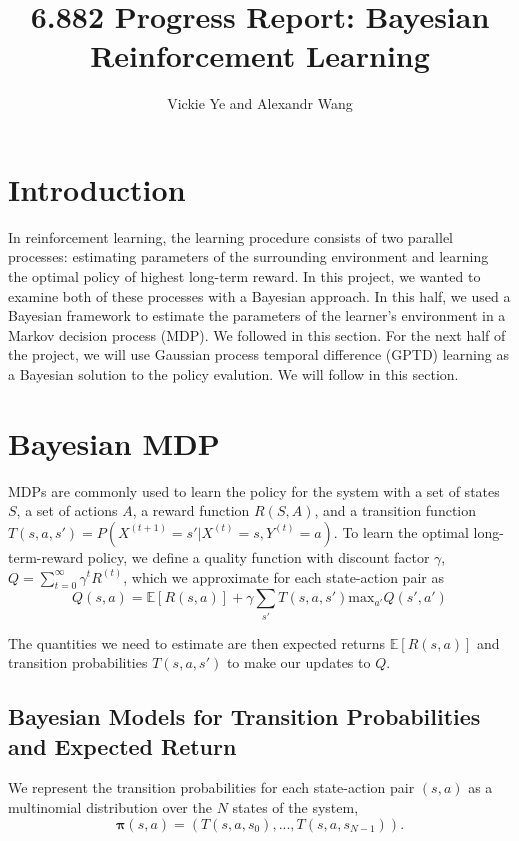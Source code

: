 \documentclass[10pt, twoside]{article}
\title{6.882 Progress Report: Bayesian Reinforcement Learning}
\date{}
\author {Vickie Ye and Alexandr Wang}
\begin{document}
\maketitle

\section{Introduction}
In reinforcement learning, the learning procedure consists of two parallel processes:
estimating parameters of the surrounding environment and learning the optimal policy
of highest long-term reward. In this project, we wanted to examine both of these
processes with a Bayesian approach. In this half, we used a Bayesian framework to
estimate the parameters of the learner's environment in a Markov decision process
(MDP). We followed \cite{strens} in this section. For the next half of
the project, we will use Gaussian process temporal difference (GPTD) learning as a
Bayesian solution to the policy evalution. We will follow \cite{engel} in this
section.

\section{Bayesian MDP}
MDPs are commonly used to learn the policy for the system with a set of states $S$,
a set of actions $A$, a reward function $R(S, A)$, and a transition function
$T(s, a, s') = P(X^{(t+1)} = s' | X^{(t)} = s, Y^{(t)} = a)$. To learn the optimal
long-term-reward policy, we define a quality function with discount factor
$\gamma$, $Q = \sum_{t=0}^\infty \gamma^t R^(t)$, which we approximate for each
state-action pair as
\begin{equation}
Q(s, a) = \mathbb{E}[R(s,a)]+\gamma\sum_{s'}T(s, a, s')\textrm{max}_{a'} Q(s',a')
\end{equation}

The quantities we need to estimate are then expected returns $\mathbb{E}[R(s, a)]$
and transition probabilities $T(s, a, s')$ to make our updates to $Q$.

\subsection{Bayesian Models for Transition Probabilities and Expected Return}
We represent the transition probabilities for each state-action pair $(s, a)$ as
a multinomial distribution over the $N$ states of the system,
\begin{equation}
\mathbf{\pi}(s, a) = (T(s, a, s_0), ..., T(s, a, s_{N-1})).
\end{equation}
\end{document}

